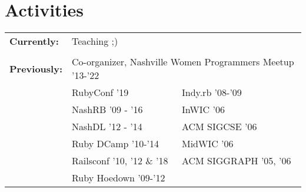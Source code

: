 \section{Activities}

\begin{tabular}[t]{@{} p{1.2in} p{1.9in} p{1.9in} @{}}
\bf{Currently:}

& \multicolumn{2}{p{3.8in}}{Teaching ;)} \\ %
\\
\bf{Previously:}
& \multicolumn{2}{p{3.8in}}{Co-organizer, Nashville Women Programmers Meetup '13-'22} \\
& RubyConf '19  & Indy.rb '08-'09  \\
& NashRB '09 - '16 &  InWIC '06\\
& NashDL '12 - '14 & ACM SIGCSE '06 \\
& Ruby DCamp '10-'14 & MidWIC '06   \\
& Railsconf '10, '12 \& '18 & ACM SIGGRAPH '05, '06 \\
& Ruby Hoedown '09-'12

\end{tabular}
